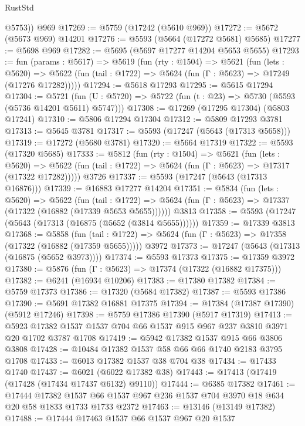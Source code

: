 \begin{lexlean}{RustStd}
\begin{coremodule}
        @5753))
    @969
@17269 := @5759 (@17242 (@5610 @969))
@17272 := @5672 (@5673 @969) @14201
@17276 := @5593 (@5664 (@17272 @5681) @5685)
@17277 := @5698 @969
@17282 := @5695 (@5697 @17277 @14204 @5653 @5655)
@17293 := fun (params : @5617) =>
  @5619
    (fun (rty : @1504) =>
    @5621
      (fun (lets : @5620) =>
      @5622 (fun (tail : @1722) => @5624 (fun (Γ : @5623) => @17249 (@17276 @17282)))))
@17294 := @5618 @17293
@17295 := @5615 @17294
@17304 := @5721
    (fun (U : @5720) => @5722 (fun (t : @23) => @5730 (@5593 (@5736 @14201 @5611) @5747)))
@17308 := @17269 (@17295 @17304) (@5803 @17241)
@17310 := @5806 @17294 @17304
@17312 := @5809 @17293 @3781
@17313 := @5645 @3781
@17317 := @5593 (@17247 (@5643 (@17313 @5658)))
@17319 := @17272 (@5680 @3781)
@17320 := @5664 @17319
@17322 := @5593 (@17320 @5685)
@17333 := @5812
    (fun (rty : @1504) =>
    @5621
      (fun (lets : @5620) =>
      @5622 (fun (tail : @1722) => @5624 (fun (Γ : @5623) => @17317 (@17322 @17282)))))
    @3726
@17337 := @5593 (@17247 (@5643 (@17313 @16876)))
@17339 := @16883 @17277 @14204
@17351 := @5834
    (fun (lets : @5620) =>
    @5622
      (fun (tail : @1722) =>
      @5624 (fun (Γ : @5623) => @17337 (@17322 (@16882 (@17339 @5653 @5655))))))
    @3813
@17358 := @5593 (@17247 (@5643 (@17313 (@16875 (@5652 (@3814 @5655))))))
@17359 := @17339 @3813
@17368 := @5858
    (fun (tail : @1722) => @5624 (fun (Γ : @5623) => @17358 (@17322 (@16882 (@17359 @5655)))))
    @3972
@17373 := @17247 (@5643 (@17313 (@16875 (@5652 @3973))))
@17374 := @5593 @17373
@17375 := @17359 @3972
@17380 := @5876 (fun (Γ : @5623) => @17374 (@17322 (@16882 @17375)))
@17382 := @6241 (@16934 @10206)
@17383 := @17380 @17382
@17384 := @5759 @17373
@17386 := @17320 (@5684 @17382)
@17387 := @5593 @17386
@17390 := @5691 @17382 @16881 @17375
@17394 := @17384 (@17387 @17390) (@5912 @17246)
@17398 := @5759 @17386 @17390 (@5917 @17319)
@17413 := @5923 @17382 @1537 @1537 @704 @66 @1537 @915 @967 @237 @3810 @3971 @20 @1702 @3787 @1708
@17419 := @5942 @17382 @1537 @915 @66 @3806 @3808
@17428 := @10484 @17382 @1537 @58 @66 @66 @1740 @2183 @3795 @1708
@17433 := @6013 @17382 @1537 @38 @704 @38
@17434 := @17433 @1740
@17437 := @6021 (@6022 @17382 @38)
@17443 := @17413 (@17419 (@17428 (@17434 @17437 @6132) @9110))
@17444 := @6385 @17382
@17461 := @17444
    @17382
    @1537
    @66
    @1537
    @967
    @236
    @1537
    @704
    @3970
    @18
    @634
    @20
    @58
    @1833
    @1733
    @1733
    @2372
@17463 := @13146 (@13149 @17382)
@17488 := @17444
    @17463
    @1537
    @66
    @1537
    @967
    @20
    @1537

\end{coremodule}
\end{lexlean}
